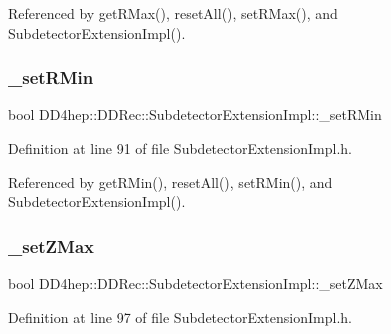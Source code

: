 Referenced by get\+R\+Max(), reset\+All(), set\+R\+Max(), and Subdetector\+Extension\+Impl().

\hypertarget{class_d_d4hep_1_1_d_d_rec_1_1_subdetector_extension_impl_aa2540f465262ee20af21a1dae2a33f12}{}\label{class_d_d4hep_1_1_d_d_rec_1_1_subdetector_extension_impl_aa2540f465262ee20af21a1dae2a33f12} 
\subsubsection{\texorpdfstring{\+\_\+set\+R\+Min}{\_setRMin}}
{\footnotesize\ttfamily bool D\+D4hep\+::\+D\+D\+Rec\+::\+Subdetector\+Extension\+Impl\+::\+\_\+set\+R\+Min\hspace{0.3cm}{\ttfamily [protected]}}



Definition at line 91 of file Subdetector\+Extension\+Impl.\+h.



Referenced by get\+R\+Min(), reset\+All(), set\+R\+Min(), and Subdetector\+Extension\+Impl().

\hypertarget{class_d_d4hep_1_1_d_d_rec_1_1_subdetector_extension_impl_a6e86e2a12196aff1d36c2b79146c9a1b}{}\label{class_d_d4hep_1_1_d_d_rec_1_1_subdetector_extension_impl_a6e86e2a12196aff1d36c2b79146c9a1b} 
\subsubsection{\texorpdfstring{\+\_\+set\+Z\+Max}{\_setZMax}}
{\footnotesize\ttfamily bool D\+D4hep\+::\+D\+D\+Rec\+::\+Subdetector\+Extension\+Impl\+::\+\_\+set\+Z\+Max\hspace{0.3cm}{\ttfamily [protected]}}



Definition at line 97 of file Subdetector\+Extension\+Impl.\+h.



